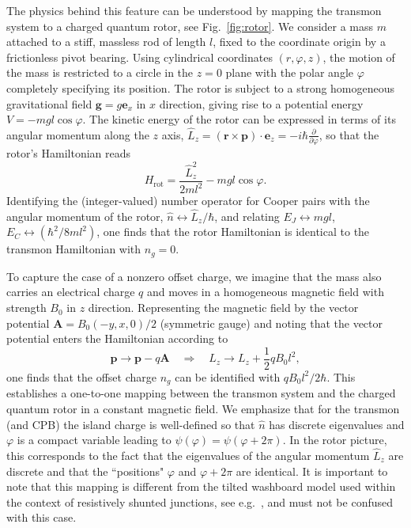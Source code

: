 \documentclass[twocolumn,amsmath,amssymb,floatfix,pra,showpacs,eqsecnum,footinbib,superscriptaddress]{revtex4}
\newcounter{fig}
\newcommand{\vc}[1]{\mathbf{#1}}
\newcommand{\be}{\begin{equation}}
\newcommand{\ee}{\end{equation}}
\begin{document}
The physics behind this feature can be understood by mapping the transmon system to a charged quantum rotor, see Fig.~\ref{fig:rotor}. We consider a mass $m$ attached to a stiff, massless rod of length $l$, fixed to the coordinate origin by a frictionless pivot bearing. Using cylindrical coordinates $(r,\varphi,z)$, the motion of the mass is restricted to a circle in the $z=0$ plane with the polar angle $\varphi$ completely specifying its position. The rotor is subject to a strong homogeneous gravitational field $\vc{g}=g\vc{e}_x$ in $x$ direction, giving rise to a potential energy $V=-mgl\cos\varphi$. The kinetic energy of the rotor can be expressed in terms of its angular momentum along the $z$ axis, $\hat{L}_z=(\vc{r}\times\vc{p})\cdot\vc{e}_z = -i\hbar\frac{\partial}{\partial \varphi}$, so that the rotor's Hamiltonian reads
\be
H_\text{rot}=\frac{\hat{L}_z^2}{2ml^2} - mgl\cos\varphi.
\ee
Identifying the (integer-valued) number operator for Cooper pairs with the angular momentum of the rotor, $\hat{n}\leftrightarrow\hat{L}_z/\hbar$, and relating $E_J\leftrightarrow mgl$, $E_C\leftrightarrow(\hbar^2/8ml^2)$, one finds that the rotor Hamiltonian is identical to the transmon Hamiltonian with $n_g=0$. 

To capture the case of a nonzero offset charge, we imagine that the mass also carries an electrical charge $q$ and moves in a homogeneous magnetic field with strength $B_0$ in $z$ direction. Representing the magnetic field by the vector potential $\vc{A}=B_0(-y,x,0)/2$ (symmetric gauge) and noting that the vector potential enters the Hamiltonian according to 
\be
\vc{p}\to\vc{p}-q\vc{A}
\quad \Rightarrow \quad
L_z\to L_z +\frac{1}{2}qB_0l^2,
\ee 
one finds that the offset charge $n_g$ can be identified with $qB_0l^2/2\hbar$. This establishes a one-to-one mapping between the transmon system and the charged quantum rotor in a constant magnetic field. We emphasize that for the transmon (and CPB) the island charge is well-defined so that $\hat{n}$ has discrete eigenvalues and $\varphi$ is a compact variable leading to $\psi(\varphi)=\psi(\varphi+2\pi)$. In the rotor picture, this corresponds to the fact that the eigenvalues of the angular momentum $\hat{L}_z$ are discrete and that the ``positions" $\varphi$ and $\varphi+2\pi$ are identical. It is important to note that this mapping is different from the tilted washboard model used within the context of resistively shunted junctions, see e.g.~\cite{tinkham}, and must not be confused with this case. 
\end{document}
